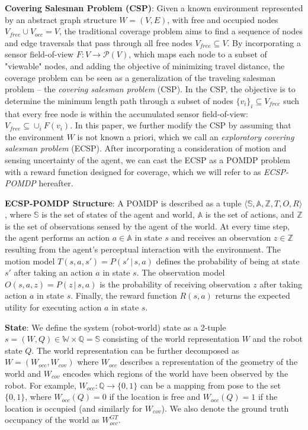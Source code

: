 \documentclass{article}
\newcommand{\ph}[1]{{\textbf{#1}:}} %
\begin{document}
\ph{Covering Salesman Problem (CSP)} Given a known environment represented by an abstract graph structure $W = (V, E)$, with free and occupied nodes $V_{free}\cup V_{occ} = V$, the traditional coverage problem aims to find a sequence of nodes and edge traversals that pass through all free nodes $V_{free} \subseteq V$.  By incorporating a sensor field-of-view $F:V\rightarrow \mathcal{P}(V)$, which maps each node to a subset of "viewable" nodes, and adding the objective of minimizing travel distance, the coverage problem can be seen as a generalization of the traveling salesman problem -- the \emph{covering salesman problem} (CSP).  In the CSP, the objective is to determine the minimum length path through a subset of nodes $\{v_i\}_i \subseteq V_{free}$ such that every free node is within the accumulated sensor field-of-view: $V_{free} \subseteq \cup_i F(v_i)$.
In this paper, we further modify the CSP by assuming that the environment $W$ is not known a priori, which we call an \emph{exploratory covering salesman problem} (ECSP).  After incorporating a consideration of motion and sensing uncertainty of the agent, we can cast the ECSP as a POMDP problem with a reward function designed for coverage, which we will refer to as \emph{ECSP-POMDP} hereafter.

\ph{ECSP-POMDP Structure} A POMDP is described as a tuple $\langle \mathbb{S}, \mathbb{A}, \mathbb{Z}, T, O, R \rangle$, where $\mathbb{S}$ is the set of states of the agent and world, $\mathbb{A}$ is the set of actions, and $\mathbb{Z}$ is the set of observations sensed by the agent of the world. At every time step, the agent performs an action $a \in \mathbb{A}$ in state $s$ and receives an observation $z \in \mathbb{Z}$ resulting from the agent's perceptual interaction with the environment. The motion model $T(s, a, s') = P(s'\,|\,s, a)$ defines the probability of being at state $s'$ after taking an action $a$ in state $s$. The observation model $O(s, a, z) = P(z\,|\,s, a)$ is the probability of receiving observation $z$ after taking action $a$ in state $s$. Finally, the reward function $R(s,a)$ returns the expected utility for executing action $a$ in state $s$.

\ph{State} We define the system (robot-world) state as a 2-tuple $s = (W, Q) \in \mathbb{W}\times\mathbb{Q} =  \mathbb{S}$ consisting of the world representation $W$ and the robot state $Q$. The world representation can be further decomposed as $W = (W_{occ}, W_{cov})$ where $W_{occ}$ describes a representation of the geometry of the world and $W_{cov}$ encodes which regions of the world have been observed by the robot.  For example, $W_{occ}:\mathbb{Q}\rightarrow\{0,1\}$ can be a mapping from pose to the set $\{0,1\}$, where $W_{occ}(Q) = 0$ if the location is free and $W_{occ}(Q) = 1$ if the location is occupied (and similarly for $W_{cov}$).  We also denote the ground truth occupancy of the world as $W_{occ}^{GT}$.
\end{document}
